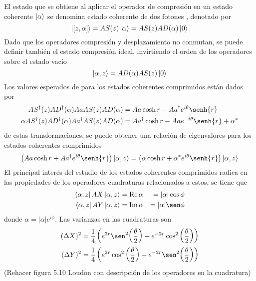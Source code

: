 El estado que se obtiene al aplicar el operador de compresión en un estado coherente $\ket{\alpha}$ se denomina estado coherente de dos fotones \cite{Mandel}, denotado por
\begin{equation*}
  \ket{[z,\alpha]} = A{S}(z)\ket{\alpha} = A{S}(z)A{D}(\alpha)\ket{0}
\end{equation*}
Dado que los operadores compresión y desplazamiento no conmutan, se puede definir también el estado compresión ideal, invirtiendo el orden de los operadores sobre el estado vacío \cite{Loudon}
\begin{equation*}
  \ket{\alpha, z} = A{D}(\alpha) A{S}(z) \ket{0}
\end{equation*}
Los valores esperados de para los estados coherentes comprimidos están dados por
\begin{align*}
  \hat{S}^\dagger(z) \hat{D}^\dagger (\alpha) \hat{a} \hat{S}(z) \hat{D}(\alpha)           & = \hat{a} \cosh{r} - \hat{a}^{\dagger} e^{i\theta}\senh{r}             \\ \alpha
  \hat{S}^\dagger(z) \hat{D}^\dagger (\alpha) \hat{a}^{\dagger} \hat{S}(z) \hat{D}(\alpha) & = \hat{a}^{\dagger} \cosh{r} - \hat{a} e^{-i\theta}\senh{r} + \alpha^*
\end{align*}
de estas transformaciones, se puede obtener una relación de eigenvalores para los estados coherentes comprimidos
\begin{equation*}
  \left( \hat{a} \cosh{r} + \hat{a}^{\dagger} e^{i\theta} \senh{r} \right) \ket{\alpha, z} = \left( \alpha \cosh{r} + \alpha^* e^{i\theta} \senh{r} \right) \ket{\alpha, z}
\end{equation*}
El principal interés del estudio de los estados coherentes comprimidos radica en las propiedades de los operadores cuadraturas relacionados a estos, se tiene que
\begin{align*}
  \bra{\alpha, z}\hat{X}\ket{\alpha, z}   & = \Re \alpha & = |\alpha| \cos\phi \\
  \bra{\alpha, z} \hat{Y} \ket{\alpha, z} & = \Im \alpha & = |\alpha| \sen\phi
\end{align*}
donde $\alpha = |\alpha|e^{i\phi}$. Las varianzas en las cuadraturas son
\begin{align*}
  (\Delta X)^2 & = \frac{1}{4}\left( e^{2r}\sen^2{\left( \frac{\theta}{2} \right)} +e^{-2r}\cos^2{\left( \frac{\theta}{2} \right)} \right) \\
  (\Delta Y)^2 & = \frac{1}{4}\left( e^{2r}\cos^2{\left( \frac{\theta}{2} \right)} +e^{-2r}\sen^2{\left( \frac{\theta}{2} \right)} \right)
\end{align*}
(Rehacer figura 5.10 Loudon con descripción de los operadores en la cuadratura)

